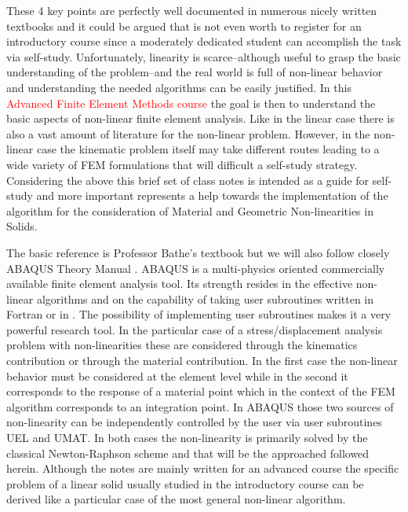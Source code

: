 These 4 key points are perfectly well documented in numerous nicely written textbooks and it could be argued that is not even worth to register for an introductory course since a moderately dedicated student can accomplish the task via self-study. Unfortunately, linearity is scarce--although useful to grasp the basic understanding of the problem--and the real world is full of non-linear behavior and understanding the needed algorithms can be easily justified. In this \textcolor{red}{Advanced Finite Element Methods course} the goal is then to understand the basic aspects of non-linear finite element analysis.  Like in the linear case there is also a vast amount of literature for the non-linear problem.  However, in the non-linear case the kinematic problem itself may take different routes leading to a wide variety of FEM formulations that will difficult a self-study strategy.  Considering the above this brief set of class notes is intended as a guide for self-study and more important represents a help towards the implementation of the algorithm for the consideration of Material and Geometric Non-linearities in Solids.

The basic reference is Professor Bathe's textbook \cite{book:bathe} but we will also follow closely ABAQUS Theory Manual \cite{abaqus_theory}. ABAQUS is a multi-physics oriented commercially available finite element analysis tool. Its strength resides in the effective non-linear algorithms and on the capability of taking user subroutines written in Fortran or in \CPP.  The possibility of implementing user subroutines makes it a very powerful research tool.  In the particular case of a stress/displacement analysis problem with non-linearities these are considered through the kinematics contribution or through the material contribution.  In the first case the non-linear behavior must be considered at the element level while in the second it corresponds to the response of a material point which in the context of the FEM algorithm corresponds to an integration point. In ABAQUS those two sources of non-linearity can be independently controlled by the user via user subroutines UEL and UMAT.  In both cases the non-linearity is primarily solved by the classical Newton-Raphson scheme and that will be the approached followed herein.  Although the notes are mainly written for an advanced course the specific problem of a linear solid usually studied in the introductory course can be derived like a particular case of the most general non-linear algorithm.

